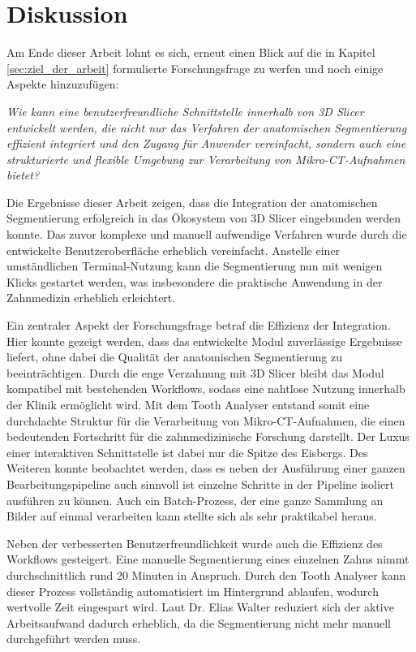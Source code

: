 \chapter{Diskussion}
\label{chap:diskussion} Am Ende dieser Arbeit lohnt es sich, erneut einen Blick
auf die in Kapitel \ref{sec:ziel_der_arbeit} formulierte Forschungsfrage zu
werfen und noch einige Aspekte hinzuzufügen:

\textit{Wie kann eine benutzerfreundliche Schnittstelle innerhalb von 3D Slicer
entwickelt werden, die nicht nur das Verfahren der anatomischen Segmentierung effizient
integriert und den Zugang für Anwender vereinfacht, sondern auch eine
strukturierte und flexible Umgebung zur Verarbeitung von Mikro-\ac{CT}-Aufnahmen
bietet?}

Die Ergebnisse dieser Arbeit zeigen, dass die Integration der anatomischen Segmentierung
erfolgreich in das Ökosystem von 3D Slicer eingebunden werden konnte. Das zuvor
komplexe und manuell aufwendige Verfahren wurde durch die entwickelte
Benutzeroberfläche erheblich vereinfacht. Anstelle einer umständlichen Terminal-Nutzung
kann die Segmentierung nun mit wenigen Klicks gestartet werden, was insbesondere
die praktische Anwendung in der Zahnmedizin erheblich erleichtert.

Ein zentraler Aspekt der Forschungsfrage betraf die Effizienz der Integration. Hier
konnte gezeigt werden, dass das entwickelte Modul zuverlässige Ergebnisse
liefert, ohne dabei die Qualität der anatomischen Segmentierung zu beeinträchtigen.
Durch die enge Verzahnung mit 3D Slicer bleibt das Modul kompatibel mit
bestehenden Workflows, sodass eine nahtlose Nutzung innerhalb der Klinik ermöglicht
wird. Mit dem Tooth Analyser entstand somit eine durchdachte Struktur für die
Verarbeitung von Mikro-\ac{CT}-Aufnahmen, die einen bedeutenden Fortschritt für
die zahnmedizinische Forschung darstellt. Der Luxus einer interaktiven Schnittstelle
ist dabei nur die Spitze des Eisbergs. Des Weiteren konnte beobachtet werden, dass
es neben der Ausführung einer ganzen Bearbeitungspipeline auch sinnvoll ist einzelne
Schritte in der Pipeline isoliert ausführen zu können. Auch ein Batch-Prozess, der
eine ganze Sammlung an Bilder auf einmal verarbeiten kann stellte sich als sehr praktikabel
heraus.

Neben der verbesserten Benutzerfreundlichkeit wurde auch die Effizienz des Workflows
gesteigert. Eine manuelle Segmentierung eines einzelnen Zahns nimmt
durchschnittlich rund 20 Minuten in Anspruch. Durch den Tooth Analyser kann dieser
Prozess vollständig automatisiert im Hintergrund ablaufen, wodurch wertvolle
Zeit eingespart wird. Laut Dr. Elias Walter reduziert sich der aktive
Arbeitsaufwand dadurch erheblich, da die Segmentierung nicht mehr manuell durchgeführt
werden muss.

